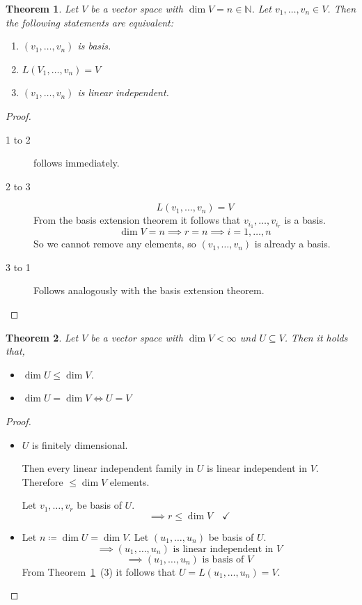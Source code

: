\documentclass[a4paper,landscape,twocolumn]{article}
\newtheorem{theorem}{Theorem}[section]
\begin{document}
\begin{theorem}
  \label{satz-3-34}
  Let $V$ be a vector space with $\dim{V} = n \in \mathbb N$.
  Let $v_1, \dots, v_n \in V$.
  Then the following statements are equivalent:
  \begin{enumerate}
    \item $(v_1, \dots, v_n)$ is basis.
    \item $L(V_1, \dots, v_n) = V$
    \item $(v_1, \dots, v_n)$ is linear independent.
  \end{enumerate}
\end{theorem}

\begin{proof}
  \begin{description}
    \item[1 to 2] follows immediately.
    \item[2 to 3]
      \[ L(v_1, \dots, v_n) = V \]
      From the basis extension theorem it follows that $v_{i_1}, \dots, v_{i_r}$ is a basis.
      \[ \dim{V} = n \implies r=n \implies i = 1, \dots, n \]
      So we cannot remove any elements, so $(v_1, \dots, v_n)$ is already a basis.
    \item[3 to 1]
      Follows analogously with the basis extension theorem.
  \end{description}
\end{proof}

\begin{theorem}
  \label{satz-3-35}
  Let $V$ be a vector space with $\dim{V} < \infty$ und $U \subseteq V$.
  Then it holds that,
  \begin{itemize}
    \item $\dim{U} \leq \dim{V}$.
    \item $\dim{U} = \dim{V} \iff U = V$
  \end{itemize}
\end{theorem}

\begin{proof}
  \begin{itemize}
    \item
      $U$ is finitely dimensional.

      Then every linear independent family in $U$ is linear independent in $V$.
      Therefore $\leq \dim{V}$ elements.

      Let $v_1, \dots, v_r$ be basis of $U$.
      \[ \implies r \leq \dim{V} \quad\checkmark \]
    \item
      Let $n \coloneqq \dim{U} = \dim{V}$. Let $(u_1, \dots, u_n)$ be basis of $U$.
      \[ \implies (u_1, \dots, u_n) \text{ is linear independent in } V \]
      \[ \implies (u_1, \dots, u_n) \text{ is basis of } V \]
      From Theorem~\ref{satz-3-34}~(3) it follows that $U = L(u_1, \dots, u_n) = V$.
  \end{itemize}
\end{proof}
\end{document}

